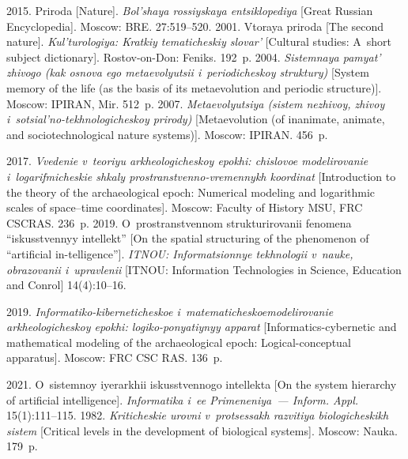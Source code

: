   \begin{multicols}{2}

\renewcommand{\bibname}{\protect\rmfamily References}

{\small\frenchspacing
 {%
 \begin{thebibliography}{9}
 2015. Priroda [Nature]. \textit{Bol'shaya rossiyskaya entsiklopediya} [Great 
Russian Encyclopedia]. Moscow: BRE. 27:519--520.
 2001. Vtoraya priroda [The second nature]. \textit{Kul'turologiya: Kratkiy 
tematicheskiy slovar'} [Cultural studies: A~short subject dictionary]. Rostov-on-Don: Feniks. 192~p.
 2004. 
\textit{Sistemnaya pamyat' zhivogo (kak osnova ego metaevolyutsii i~periodicheskoy struktury)} 
[System memory of the life (as the basis of its metaevolution and periodic structure)]. Moscow: 
IPIRAN, Mir. 512~p.
 2007. \textit{Metaevolyutsiya (sistem nezhivoy, zhivoy  
i~sotsial'no-tekhnologicheskoy prirody)} [Metaevolution (of inanimate, animate, and 
sociotechnological nature systems)]. Moscow: IPIRAN. 456~p.

 2017. \textit{Vvedenie v~teoriyu 
arkheologicheskoy epokhi: chislovoe modelirovanie i~logarifmicheskie shkaly prostranstvenno-vremennykh 
koordinat} [Introduction to the theory of the archaeological epoch: Numerical 
modeling and logarithmic scales of space--time coordinates]. Moscow: Faculty of History MSU, 
FRC CSCRAS. 236~p.
 2019. O~prostranstvennom struk\-tu\-ri\-ro\-va\-nii fenomena ``iskusstvennyy 
intellekt'' [On the spatial structuring of the phenomenon of ``artificial in-telligence'']. 
\textit{ITNOU: Informatsionnye tekhnologii v~nauke, ob\-ra\-zo\-va\-nii i~upravlenii} [ITNOU: 
Information Technologies in Science, Education and Conrol] 14(4):10--16.


 2019.
 \textit{Informatiko-kiberneticheskoe i~ma\-te\-ma\-ti\-che\-skoe\linebreak modelirovanie arkheologicheskoy epokhi: 
logiko-ponyatiynyy apparat} [Informatics-cybernetic and {mathematical} modeling of the 
archaeological epoch: Logical-conceptual apparatus]. Moscow: FRC CSC RAS. 136~p.

 2021. O~sistemnoy iyerarkhii is\-kus\-st\-ven\-no\-go intellekta [On the system 
hierarchy of artificial intelligence]. \textit{Informatika i~ee Primeneniya~--- Inform. Appl.} 
 15(1):111--115.
 1982. \textit{Kriticheskie urovni v~protsessakh 
razvitiya biologicheskikh sis\-tem} [Critical levels in the development of biological systems]. 
Moscow: Nauka. 179~p.

\end{thebibliography}

 }
 }

\end{multicols}


